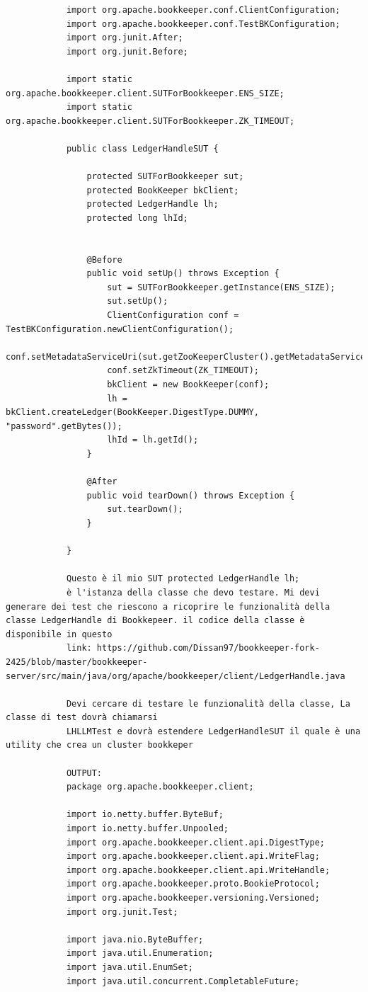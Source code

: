 \documentclass[10pt]{article}
\begin{document}
{\begin{verbatim}
			import org.apache.bookkeeper.conf.ClientConfiguration;
			import org.apache.bookkeeper.conf.TestBKConfiguration;
			import org.junit.After;
			import org.junit.Before;
			
			import static org.apache.bookkeeper.client.SUTForBookkeeper.ENS_SIZE;
			import static org.apache.bookkeeper.client.SUTForBookkeeper.ZK_TIMEOUT;
			
			public class LedgerHandleSUT {
				
				protected SUTForBookkeeper sut;
				protected BookKeeper bkClient;
				protected LedgerHandle lh;
				protected long lhId;
				
				
				@Before
				public void setUp() throws Exception {
					sut = SUTForBookkeeper.getInstance(ENS_SIZE);
					sut.setUp();
					ClientConfiguration conf = TestBKConfiguration.newClientConfiguration();
					conf.setMetadataServiceUri(sut.getZooKeeperCluster().getMetadataServiceUri());
					conf.setZkTimeout(ZK_TIMEOUT);
					bkClient = new BookKeeper(conf);
					lh = bkClient.createLedger(BookKeeper.DigestType.DUMMY, "password".getBytes());
					lhId = lh.getId();
				}
				
				@After
				public void tearDown() throws Exception {
					sut.tearDown();
				}
				
			}
			
			Questo è il mio SUT protected LedgerHandle lh;
			è l'istanza della classe che devo testare. Mi devi generare dei test che riescono a ricoprire le funzionalità della classe LedgerHandle di Bookkepeer. il codice della classe è disponibile in questo 
			link: https://github.com/Dissan97/bookkeeper-fork-2425/blob/master/bookkeeper-server/src/main/java/org/apache/bookkeeper/client/LedgerHandle.java
			
			Devi cercare di testare le funzionalità della classe, La classe di test dovrà chiamarsi 
			LHLLMTest e dovrà estendere LedgerHandleSUT il quale è una utility che crea un cluster bookkeper
			
			OUTPUT:
			package org.apache.bookkeeper.client;
			
			import io.netty.buffer.ByteBuf;
			import io.netty.buffer.Unpooled;
			import org.apache.bookkeeper.client.api.DigestType;
			import org.apache.bookkeeper.client.api.WriteFlag;
			import org.apache.bookkeeper.client.api.WriteHandle;
			import org.apache.bookkeeper.proto.BookieProtocol;
			import org.apache.bookkeeper.versioning.Versioned;
			import org.junit.Test;
			
			import java.nio.ByteBuffer;
			import java.util.Enumeration;
			import java.util.EnumSet;
			import java.util.concurrent.CompletableFuture;
			

\end{verbatim}}
\end{document}
